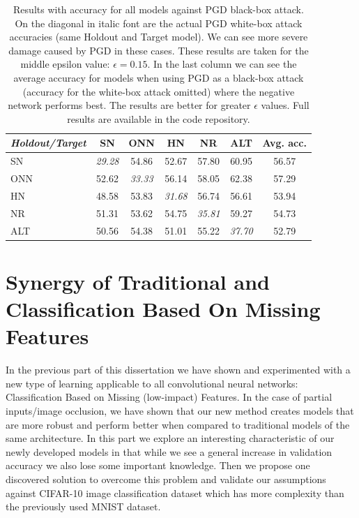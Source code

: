 \documentclass[b5paper]{book}
\begin{document}
\begin{table}[ht]
  \centering
  \begin{tabular}{l|ccccc|c}
    \toprule
     \textit{Holdout/Target} & SN & ONN & HN & NR & ALT & {Avg. acc.} \\
    \midrule
     SN & \textit{{29.28}} & {54.86} & {52.67} & {57.80} & {60.95} & {56.57} \\
     ONN & {52.62} & \textit{{33.33}} & {56.14} & {58.05} & {62.38} & {57.29} \\
     HN & {48.58} & {53.83} & \textit{{31.68}} & {56.74} & {56.61} & {53.94} \\
     NR &{51.31} & {53.62} & {54.75} & \textit{{35.81}} & {59.27} & {54.73}\\ 
     ALT & {50.56} & {54.38} & {51.01} & {55.22} & \textit{{37.70}} & {52.79}\\
    \bottomrule
  \end{tabular}
  \caption{Results with accuracy for all models against PGD black-box attack. On the diagonal in italic font are the actual PGD white-box attack accuracies (same Holdout and Target model). We can see more severe damage caused by PGD in these cases. These results are taken for the middle epsilon value: \(\epsilon = 0.15 \). In the last column we can see the average accuracy for models when using PGD as a black-box attack (accuracy for the white-box attack omitted) where the negative network performs best. The results are better for greater \(\epsilon\) values. Full results are available in the code repository.}
  \label{tab:results-pgd}
\end{table} 

\part{Synergy of Traditional and Classification Based On Missing Features}

In the previous part of this dissertation we have shown and experimented with a new type of learning applicable to all convolutional neural networks: Classification Based on Missing (low-impact) Features. In the case of partial inputs/image occlusion, we have shown that our new method creates models that are more robust and perform better when compared to traditional models of the same architecture. In this part we explore an interesting characteristic of our newly developed models in that while we see a general increase in validation accuracy we also lose some important knowledge. Then we propose one discovered solution to overcome this problem and validate our assumptions against CIFAR-10 image classification dataset which has more complexity than the previously used MNIST dataset.
\end{document}
